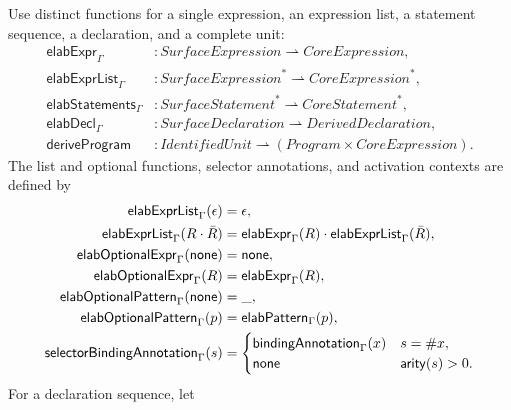 Use distinct functions for a single expression, an expression list, a
statement sequence, a declaration, and a complete unit:
\begin{equation}\label{eq:elaboration-function-signatures}
\begin{aligned}
 \mathsf{elabExpr}_{\Gamma}&:\mathit{SurfaceExpression}\rightharpoonup
     \mathit{CoreExpression},\\
 \mathsf{elabExprList}_{\Gamma}&:\mathit{SurfaceExpression}^{*}
     \rightharpoonup\mathit{CoreExpression}^{*},\\
 \mathsf{elabStatements}_{\Gamma}&:\mathit{SurfaceStatement}^{*}
     \rightharpoonup\mathit{CoreStatement}^{*},\\
 \mathsf{elabDecl}_{\Gamma}&:\mathit{SurfaceDeclaration}
     \rightharpoonup\mathit{DerivedDeclaration},\\
 \mathsf{deriveProgram}&:\mathit{IdentifiedUnit}\rightharpoonup
     (\mathit{Program}\times\mathit{CoreExpression}).
\end{aligned}
\end{equation}
The list and optional functions, selector annotations, and activation contexts
are defined by
\begin{equation}\label{eq:elaboration-helper-functions}
\begin{aligned}
 \mathsf{elabExprList}_{\Gamma}(\epsilon)&=\epsilon,\\
 \mathsf{elabExprList}_{\Gamma}(R\cdot\bar R)&=
   \mathsf{elabExpr}_{\Gamma}(R)\cdot
   \mathsf{elabExprList}_{\Gamma}(\bar R),\\
 \mathsf{elabOptionalExpr}_{\Gamma}(\mathsf{none})&=\mathsf{none},\\
 \mathsf{elabOptionalExpr}_{\Gamma}(R)&=\mathsf{elabExpr}_{\Gamma}(R),\\
 \mathsf{elabOptionalPattern}_{\Gamma}(\mathsf{none})&=\_,\\
 \mathsf{elabOptionalPattern}_{\Gamma}(p)&=\mathsf{elabPattern}_{\Gamma}(p),\\
 \mathsf{selectorBindingAnnotation}_{\Gamma}(s)&=
  \begin{cases}
   \mathsf{bindingAnnotation}_{\Gamma}(x)&s=\#x,\\
   \mathsf{none}&\mathsf{arity}(s)>0.
  \end{cases}
\end{aligned}
\end{equation}
For a declaration sequence, let

